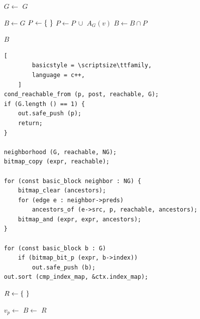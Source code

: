 \documentclass[xcolor = {dvipsnames, table}]{beamer}
\begin{document}
\begin{frame}
    \begin{algorithmic}[1]
            \State $G \gets$ 
                \State \Return $G$
            \EndIf

            \State $B \gets G$
                \State $P \gets \set{}$
                    \State $P \gets P\ \cup$ $A_G(v)$
                \EndFor
                \State $B \gets B \cap P$
            \EndFor

            \State \Return $B$
        \EndFunction
    \end{algorithmic}
\end{frame}

\begin{frame}[fragile]
    \begin{lstlisting}[
        basicstyle = \scriptsize\ttfamily,
        language = c++,
    ]
cond_reachable_from (p, post, reachable, G);
if (G.length () == 1) {
    out.safe_push (p);
    return;
}

neighborhood (G, reachable, NG);
bitmap_copy (expr, reachable);

for (const basic_block neighbor : NG) {
    bitmap_clear (ancestors);
    for (edge e : neighbor->preds)
        ancestors_of (e->src, p, reachable, ancestors);
    bitmap_and (expr, expr, ancestors);
}

for (const basic_block b : G)
    if (bitmap_bit_p (expr, b->index))
        out.safe_push (b);
out.sort (cmp_index_map, &ctx.index_map);
    \end{lstlisting}
\end{frame}

\begin{frame}
    \begin{algorithmic}[1]
            \State $R \gets \set{}$


                    \State $v_p \gets$ 
                    \State $B \gets$ 
                    \State {}
                    \State {}
                \Else
                    \State {}
                \EndIf
            \EndFor
            \State \Return $R$
        \EndFunction
    \end{algorithmic}
\end{frame}
\end{document}
